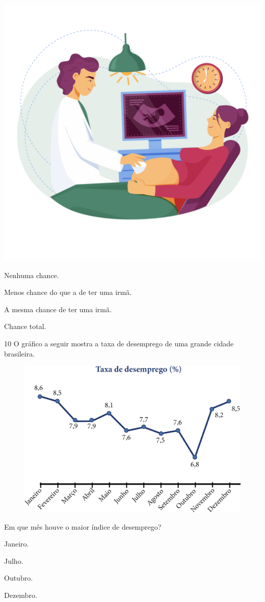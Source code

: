 \begin{center}
\includegraphics[width=.6\textwidth]{media/image78c.jpeg}
\end{center}

\begin{escolha}
\item
  Nenhuma chance.
\item
  Menos chance do que a de ter uma irmã.
\item
  A mesma chance de ter uma irmã.
\item
  Chance total.
\end{escolha}

\pagebreak
\num{10} O gráfico a seguir mostra a taxa de desemprego de uma grande cidade
brasileira.

\begin{figure}[htpb!]
\centering
\includegraphics[width=.7\textwidth]{media/image79.png}
\end{figure}

Em que mês houve o maior índice de desemprego?

\begin{multicols}{2}
\begin{escolha}
\item
  Janeiro.
\item
  Julho.
\item
  Outubro.
\item
  Dezembro.
\end{escolha}
\end{multicols}

